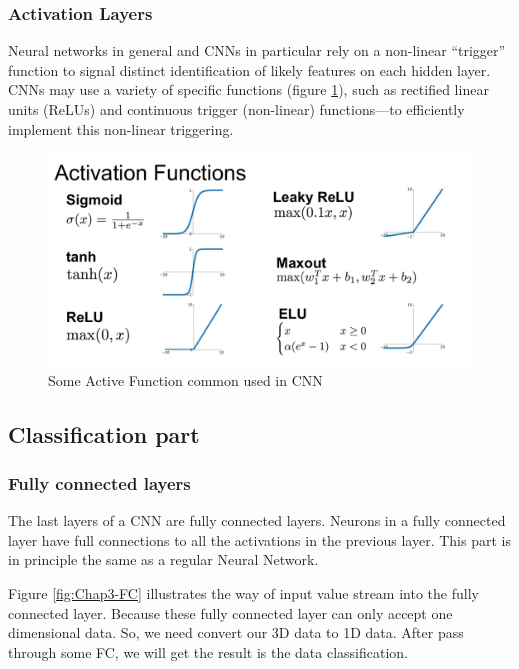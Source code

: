 
      \subsubsection{ Activation Layers }
        Neural networks in general and CNNs in particular rely on a non-linear “trigger” function 
        to signal distinct identification of likely features on each hidden layer. CNNs may use a 
        variety of specific functions (figure \ref{fig:Chap3-CNN_ActiveFunction}), such as rectified linear
        units (ReLUs) and continuous trigger (non-linear) functions—to efficiently implement this non-linear triggering.
        \begin{figure}[H]
          \centering
          \includegraphics[width=\textwidth]{img/Chap3/ActiveFunction}
          \caption{ Some Active Function common used in CNN }
          \label{fig:Chap3-CNN_ActiveFunction}
        \end{figure}
    \subsection{ Classification part }
      \subsubsection{ Fully connected layers }
        The last layers of a CNN are fully connected layers. Neurons in a 
        fully connected layer have full connections to all the activations in the previous 
        layer. This part is in principle the same as a regular Neural Network.

        Figure \ref{fig:Chap3-FC} illustrates the way of input value stream into the fully connected layer.
        Because these fully connected layer can only accept one dimensional data. So, we need convert our 3D
        data to 1D data. After pass through some FC, we will get the result is the data
        classification.

